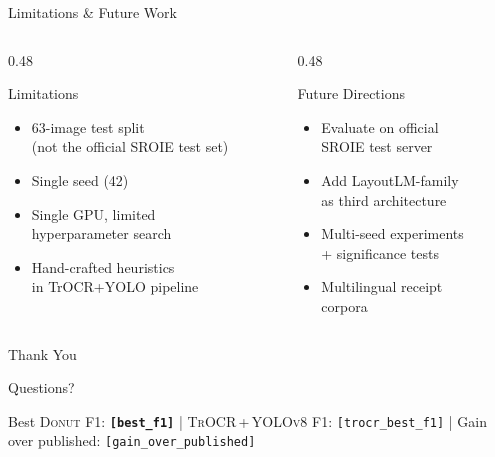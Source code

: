 \documentclass[aspectratio=169,11pt]{beamer}
\newcommand{\VAR}[1]{\texttt{[#1]}\xspace}
\newcommand{\donut}{\textsc{Donut}\xspace}
\newcommand{\trocr}{\textsc{TrOCR}\xspace}
\newcommand{\yolo}{\textsc{YOLOv8}\xspace}
\newcommand{\hlnum}[1]{\textcolor{AccentTeal}{\textbf{#1}}}
\begin{document}
\begin{frame}{Limitations \& Future Work}
  \begin{columns}[T]
    \begin{column}{0.48\textwidth}
      \begin{alertblock}{Limitations}
        \begin{itemize}
          \item 63-image test split\\
                (not the official SROIE test set)
          \item Single seed (42)
          \item Single GPU, limited\\
                hyperparameter search
          \item Hand-crafted heuristics\\
                in TrOCR+YOLO pipeline
        \end{itemize}
      \end{alertblock}
    \end{column}
    \begin{column}{0.48\textwidth}
      \begin{block}{Future Directions}
        \begin{itemize}
          \item Evaluate on official\\
                SROIE test server
          \item Add LayoutLM-family\\
                as third architecture
          \item Multi-seed experiments\\
                + significance tests
          \item Multilingual receipt\\
                corpora
        \end{itemize}
      \end{block}
    \end{column}
  \end{columns}
\end{frame}

{
\begin{frame}[noframenumbering]
  \centering
  \vspace{1cm}
  {\Huge\textcolor{PrimaryBlue}{Thank You}}

  \vspace{1cm}
  {\Large Questions?}

  \vspace{1cm}
  {\small
    Best \donut F1: \hlnum{\VAR{best_f1}} \quad|\quad
    \trocr\,+\,\yolo F1: \VAR{trocr_best_f1} \quad|\quad
    Gain over published: \VAR{gain_over_published}
  }
\end{frame}
}
\end{document}
